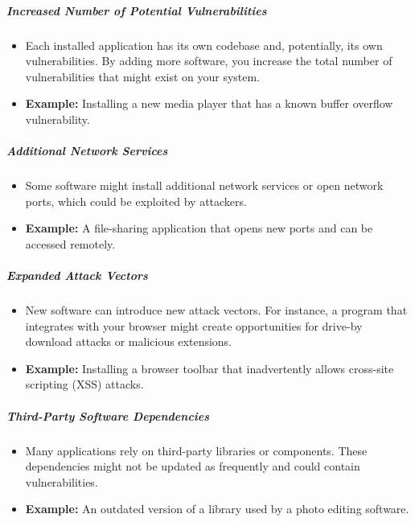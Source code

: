 \documentclass{article}
\begin{document}
                            \subparagraph{Increased Number of Potential Vulnerabilities}
                            \begin{itemize}
                                \item Each installed application has its own codebase and, potentially, its own vulnerabilities. By adding more software, you increase the total number of vulnerabilities that might exist on your system.
                                \item \textbf{Example:} Installing a new media player that has a known buffer overflow vulnerability.
                            \end{itemize}

                            \subparagraph{Additional Network Services}
                            \begin{itemize}
                                \item Some software might install additional network services or open network ports, which could be exploited by attackers.
                                \item \textbf{Example:} A file-sharing application that opens new ports and can be accessed remotely.
                            \end{itemize}

                            \subparagraph{Expanded Attack Vectors}
                            \begin{itemize}
                                \item New software can introduce new attack vectors. For instance, a program that integrates with your browser might create opportunities for drive-by download attacks or malicious extensions.
                                \item \textbf{Example:} Installing a browser toolbar that inadvertently allows cross-site scripting (XSS) attacks.
                            \end{itemize}

                            \subparagraph{Third-Party Software Dependencies}
                            \begin{itemize}
                                \item Many applications rely on third-party libraries or components. These dependencies might not be updated as frequently and could contain vulnerabilities.
                                \item \textbf{Example:} An outdated version of a library used by a photo editing software.
                            \end{itemize}
\end{document}
